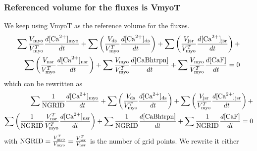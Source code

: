 \subsubsection{Referenced volume for the fluxes is VmyoT}

We keep using VmyoT as the reference volume for the fluxes. 
\begin{equation}
\begin{split}
 \sum \frac{V_{\text{myo}}}{V_{\text{myo}}^T} \frac{d[{\text{Ca}^{2+}}]_{\text{myo}}}{dt} +  
   \sum\left(\frac{V_{\text{ds}}}{V_{\text{myo}}^T}\frac{d[{\text{Ca}^{2+}}]_{\text{ds}}}{dt}\right) + 
  \sum\left(\frac{V_{\text{jsr}}}{V_{\text{myo}}^T}\frac{d[{\text{Ca}^{2+}}]_{\text{jsr}}}{dt}\right) + \\
  \sum \left(\frac{V_{\text{nsr}}}{V_{\text{myo}}^T}\frac{d[{\text{Ca}^{2+}}]_{\text{nsr}}}{dt} \right)+ \sum
  \frac{V_{\text{myo}}}{V_{\text{myo}}^T} \frac{d[{\text{CaBhtrpn}}]}{dt} + \sum \frac{V_{\text{myo}}}{V_{\text{myo}}^T}
  \frac{d[\text{CaF}]}{dt} = 0
\end{split}
\end{equation}
which can be rewritten as
\begin{equation}
\begin{split}
 \sum \frac{1}{{\text{NGRID}}} \frac{d[{\text{Ca}^{2+}}]_{\text{myo}}}{dt} +  
  \sum\left(\frac{V_{\text{ds}}}{V_{\text{myo}}^T}\frac{d[{\text{Ca}^{2+}}]_{\text{ds}}}{dt}\right) + 
  \sum\left(\frac{V_{\text{jsr}}}{V_{\text{myo}}^T}\frac{d[{\text{Ca}^{2+}}]_{\text{jsr}}}{dt}\right) + \\
  \sum \left(\frac{1}{{\text{NGRID}}}\frac{V_{\text{nsr}}^T}{V_{\text{myo}}^T}\frac{d[{\text{Ca}^{2+}}]_{\text{nsr}}}{dt}
  \right)+
  \sum \frac{1}{{\text{NGRID}}} \frac{d[{\text{CaBhtrpn}}]}{dt} + 
  \sum \frac{1}{{\text{NGRID}}}\frac{d[\text{CaF}]}{dt} = 0
\end{split}
\end{equation}
with ${\text{NGRID}}=\frac{V_{\text{myo}}^T}{V_{\text{myo}}}=\frac{V_{\text{nsr}}^T}{V_{\text{nsr}}}$ is the number of
grid points.
We rewrite it either
